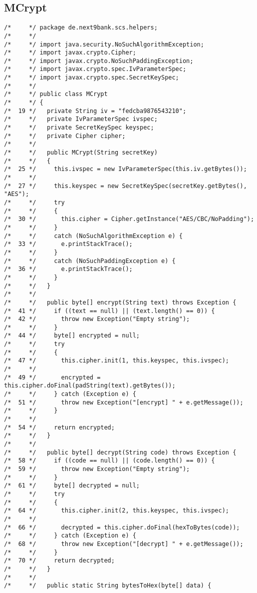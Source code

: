 \subsection{MCrypt}

\begin{lstlisting}
/*     */ package de.next9bank.scs.helpers;
/*     */ 
/*     */ import java.security.NoSuchAlgorithmException;
/*     */ import javax.crypto.Cipher;
/*     */ import javax.crypto.NoSuchPaddingException;
/*     */ import javax.crypto.spec.IvParameterSpec;
/*     */ import javax.crypto.spec.SecretKeySpec;
/*     */ 
/*     */ public class MCrypt
/*     */ {
/*  19 */   private String iv = "fedcba9876543210";
/*     */   private IvParameterSpec ivspec;
/*     */   private SecretKeySpec keyspec;
/*     */   private Cipher cipher;
/*     */ 
/*     */   public MCrypt(String secretKey)
/*     */   {
/*  25 */     this.ivspec = new IvParameterSpec(this.iv.getBytes());
/*     */ 
/*  27 */     this.keyspec = new SecretKeySpec(secretKey.getBytes(), "AES");
/*     */     try
/*     */     {
/*  30 */       this.cipher = Cipher.getInstance("AES/CBC/NoPadding");
/*     */     }
/*     */     catch (NoSuchAlgorithmException e) {
/*  33 */       e.printStackTrace();
/*     */     }
/*     */     catch (NoSuchPaddingException e) {
/*  36 */       e.printStackTrace();
/*     */     }
/*     */   }
/*     */ 
/*     */   public byte[] encrypt(String text) throws Exception {
/*  41 */     if ((text == null) || (text.length() == 0)) {
/*  42 */       throw new Exception("Empty string");
/*     */     }
/*  44 */     byte[] encrypted = null;
/*     */     try
/*     */     {
/*  47 */       this.cipher.init(1, this.keyspec, this.ivspec);
/*     */ 
/*  49 */       encrypted = this.cipher.doFinal(padString(text).getBytes());
/*     */     } catch (Exception e) {
/*  51 */       throw new Exception("[encrypt] " + e.getMessage());
/*     */     }
/*     */ 
/*  54 */     return encrypted;
/*     */   }
/*     */ 
/*     */   public byte[] decrypt(String code) throws Exception {
/*  58 */     if ((code == null) || (code.length() == 0)) {
/*  59 */       throw new Exception("Empty string");
/*     */     }
/*  61 */     byte[] decrypted = null;
/*     */     try
/*     */     {
/*  64 */       this.cipher.init(2, this.keyspec, this.ivspec);
/*     */ 
/*  66 */       decrypted = this.cipher.doFinal(hexToBytes(code));
/*     */     } catch (Exception e) {
/*  68 */       throw new Exception("[decrypt] " + e.getMessage());
/*     */     }
/*  70 */     return decrypted;
/*     */   }
/*     */ 
/*     */   public static String bytesToHex(byte[] data) {

\end{lstlisting}
